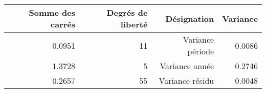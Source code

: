 \begin{tabular}{rrrr}
\toprule
    \textbf{Somme des carrés} & \textbf{Degrés de liberté} & \textbf{Désignation} & \textbf{Variance} \\
\midrule
    0.0951 & 11 & Variance période & 0.0086    \\ 
    1.3728 & 5  & Variance année   & 0.2746    \\ 
    0.2657 & 55 & Variance résidu  & 0.0048    \\
\bottomrule 
\end{tabular}